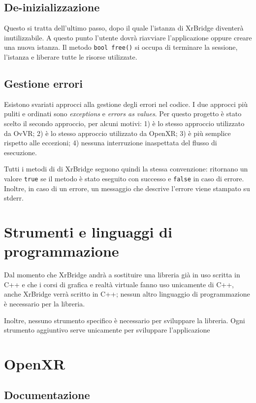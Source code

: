\documentclass[twoside]{supsistudent}
\begin{document}
\subsection{De-inizializzazione}

Questo si tratta dell'ultimo passo, dopo il quale l'istanza di XrBridge diventerà inutilizzabile. A questo punto l'utente dovrà riavviare l'applicazione oppure creare una nuova istanza. Il metodo \texttt{bool free()} si occupa di terminare la sessione, l'istanza e liberare tutte le risorse utilizzate.

\subsection{Gestione errori}

Esistono svariati approcci alla gestione degli errori nel codice. I due approcci più puliti e ordinati sono \textit{exceptions} e \textit{errors as values}. Per questo progetto è stato scelto il secondo approccio, per alcuni motivi: 1) è lo stesso approccio utilizzato da OvVR; 2) è lo stesso approccio utilizzato da OpenXR; 3) è più semplice rispetto alle eccezioni; 4) nessuna interruzione inaspettata del flusso di esecuzione.

Tutti i metodi di di XrBridge seguono quindi la stessa convenzione: ritornano un valore \texttt{true} se il metodo è stato eseguito con successo e \texttt{false} in caso di errore. Inoltre, in caso di un errore, un messaggio che descrive l'errore viene stampato su stderr.

\section{Strumenti e linguaggi di programmazione}

Dal momento che XrBridge andrà a sostituire una libreria già in uso scritta in C++ e che i corsi di grafica e realtà virtuale fanno uso unicamente di C++, anche XrBridge verrà scritto in C++; nessun altro linguaggio di programmazione è necessario per la libreria.

Inoltre, nessuno strumento specifico è necessario per sviluppare la libreria. Ogni strumento aggiuntivo serve unicamente per sviluppare l'applicazione

\section{OpenXR}

\subsection{Documentazione}
\end{document}
